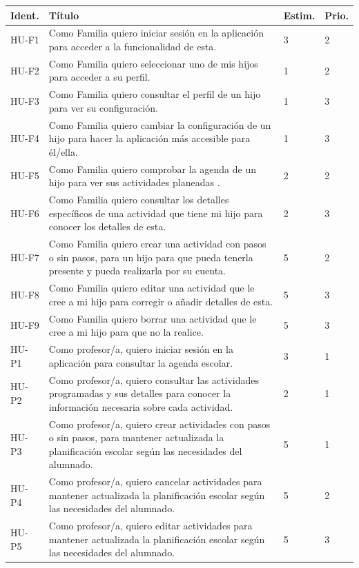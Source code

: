 \begin{xltabular}{\textwidth}{p{1.8cm} X p{1.3cm} p{1.1cm}}
\toprule
{}
\textbf{Ident.} & \textbf{Título} & \textbf{Estim.} & \textbf{Prio.} \\
\midrule
\endhead

\bottomrule
\endfoot

HU-F1 & Como Familia quiero iniciar sesión en la aplicación para acceder a la funcionalidad de esta. & 3 & 2 \\
HU-F2 & Como Familia quiero seleccionar uno de mis hijos para acceder a su perfil. & 1 & 2 \\
HU-F3 & Como Familia quiero consultar el perfil de un hijo para ver su configuración. & 1 & 3 \\
HU-F4 & Como Familia quiero cambiar la configuración de un hijo para hacer la aplicación más accesible para él/ella. & 1 & 3 \\
HU-F5 & Como Familia quiero comprobar la agenda de un hijo para ver sus actividades planeadas . & 2 & 2 \\
HU-F6 & Como Familia quiero consultar los detalles específicos de una actividad que tiene mi hijo para conocer los detalles de esta. & 2 & 3 \\
HU-F7 & Como Familia quiero crear una actividad con pasos o sin pasos, para un hijo para que pueda tenerla presente y pueda realizarla por su cuenta. & 5 & 2 \\
HU-F8 & Como Familia quiero editar una actividad que le cree a mi hijo para corregir o añadir detalles de esta. & 5 & 3 \\
HU-F9 & Como Familia quiero borrar una actividad que le cree a mi hijo para que no la realice. & 5 & 3 \\
HU-P1 & Como profesor/a, quiero iniciar sesión en la aplicación para consultar la agenda escolar. & 3 & 1 \\
HU-P2 & Como profesor/a, quiero consultar las actividades programadas y sus detalles para conocer la información necesaria sobre cada actividad. & 2 & 1 \\
HU-P3 & Como profesor/a, quiero crear actividades con pasos o sin pasos, para mantener actualizada la planificación escolar según las necesidades del alumnado.~ & 5 & 1 \\
HU-P4 & Como profesor/a, quiero cancelar actividades para mantener actualizada la planificación escolar según las necesidades del alumnado.~ & 5 & 2 \\
HU-P5 & Como profesor/a, quiero editar actividades para mantener actualizada la planificación escolar según las necesidades del alumnado.~ & 5 & 3 \\

\end{xltabular}
